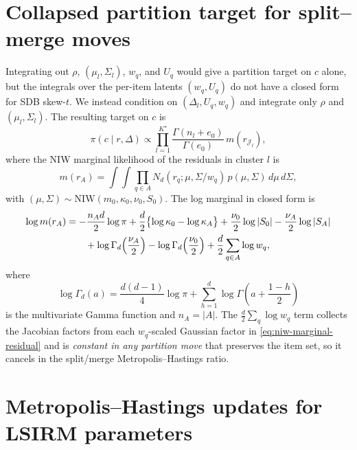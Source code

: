 \documentclass[11pt]{article}
\begin{document}
\section{Collapsed partition target for split--merge moves}
\label{sec:collapsed-partition}

Integrating out $\rho$, $(\mu_l,\Sigma_l)$, $w_q$, and $U_q$ would give a
partition target on $c$ alone, but the integrals over the per-item latents
$(w_q,U_q)$ do not have a closed form for SDB skew-$t$.  We instead
condition on $(\Delta_l,U_q,w_q)$ and integrate only $\rho$ and
$(\mu_l,\Sigma_l)$.  The resulting target on $c$ is
\begin{equation}
    \pi(c\mid r,\Delta)
    \propto
    \prod_{l=1}^{K^\star}
    \frac{\Gamma(n_l+e_0)}{\Gamma(e_0)}
    \,m(r_{\mathcal J_l}),
    \label{eq:partition-target}
\end{equation}
where the NIW marginal likelihood of the residuals in cluster $l$ is
\begin{equation}
    m(r_A)
    =
    \int\!\!\int
    \prod_{q\in A}N_d(r_q;\mu,\Sigma/w_q)
    \,p(\mu,\Sigma)\,d\mu\,d\Sigma,
    \label{eq:niw-marginal-residual}
\end{equation}
with $(\mu,\Sigma)\sim\mathrm{NIW}(m_0,\kappa_0,\nu_0,S_0)$.  The log
marginal in closed form is
\begin{align}
    \log m(r_A)
    &=-\frac{n_A d}{2}\log\pi
    +\frac{d}{2}\bigl\{\log\kappa_0-\log\kappa_A\bigr\}
    +\frac{\nu_0}{2}\log|S_0|
    -\frac{\nu_A}{2}\log|S_A|
    \notag\\
    &\qquad
    +\log\Gamma_d\!\left(\frac{\nu_A}{2}\right)
    -\log\Gamma_d\!\left(\frac{\nu_0}{2}\right)
    +\frac{d}{2}\sum_{q\in A}\log w_q,
    \label{eq:niw-marginal}
\end{align}
where
\begin{equation}
    \log\Gamma_d(a)
    =
    \frac{d(d-1)}{4}\log\pi
    +\sum_{h=1}^d\log\Gamma\!\left(a+\frac{1-h}{2}\right)
\end{equation}
is the multivariate Gamma function and $n_A=|A|$.  The
$\frac{d}{2}\sum_q\log w_q$ term collects the Jacobian factors from each
$w_q$-scaled Gaussian factor in \eqref{eq:niw-marginal-residual} and is
\emph{constant in any partition move} that preserves the item set, so it
cancels in the split/merge Metropolis--Hastings ratio.

\section{Metropolis--Hastings updates for LSIRM parameters}
\label{sec:lsirm-mh}
\end{document}

